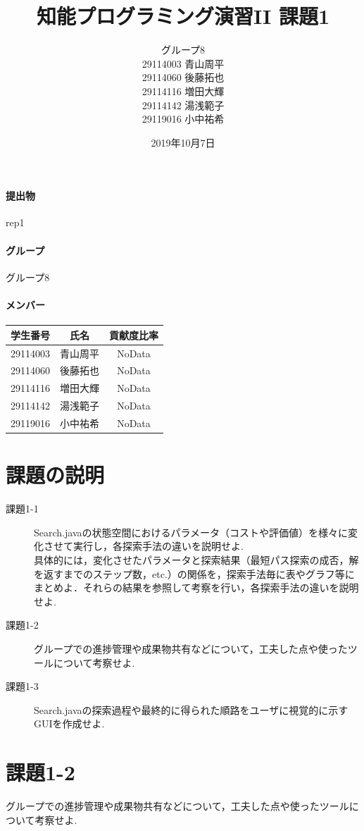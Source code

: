 \documentclass[uplatex,12pt]{jsarticle}
\title{知能プログラミング演習II 課題1}
\author{グループ8\\
  29114003 青山周平\\
  29114060 後藤拓也\\
  29114116 増田大輝\\
  29114142 湯浅範子\\
  29119016 小中祐希\\
}
\date{2019年10月7日}
\begin{document}
\maketitle

\paragraph{提出物} rep1
\paragraph{グループ} グループ8

\paragraph{メンバー}
\begin{tabular}{|c|c|c|}
  \hline
  学生番号&氏名&貢献度比率\\
  \hline\hline
  29114003&青山周平&NoData\\
  \hline
  29114060&後藤拓也&NoData\\
  \hline
  29114116&増田大輝&NoData\\
  \hline
  29114142&湯浅範子&NoData\\
  \hline
  29119016&小中祐希&NoData\\
  \hline
\end{tabular}



\section{課題の説明}
\begin{description}
\item[課題1-1] Search.javaの状態空間におけるパラメータ（コストや評価値）を様々に変化させて実行し，各探索手法の違いを説明せよ. \\
具体的には，変化させたパラメータと探索結果（最短パス探索の成否，解を返すまでのステップ数，etc.）の関係を，探索手法毎に表やグラフ等にまとめよ．それらの結果を参照して考察を行い，各探索手法の違いを説明せよ. \\
\item[課題1-2] グループでの進捗管理や成果物共有などについて，工夫した点や使ったツールについて考察せよ.
\item[課題1-3] Search.javaの探索過程や最終的に得られた順路をユーザに視覚的に示すGUIを作成せよ. 
\end{description}

\section{課題1-2}
\begin{screen}
  グループでの進捗管理や成果物共有などについて，工夫した点や使ったツールについて考察せよ.
\end{screen}
\end{document}
